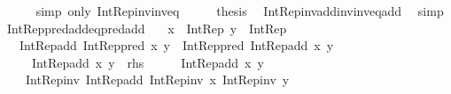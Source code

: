 \begin{isabellebody}
\ \ \ \ \isamarkupfalse%
\ {\isacharparenleft}{\kern0pt}simp\ only{\isacharcolon}{\kern0pt}\ Int{\isacharunderscore}{\kern0pt}Rep{\isacharunderscore}{\kern0pt}inv{\isacharunderscore}{\kern0pt}inv{\isacharunderscore}{\kern0pt}eq{\isacharparenright}{\kern0pt}\isanewline
\ \ \isamarkupfalse%
\ \isamarkupfalse%
\ {\isacharquery}{\kern0pt}thesis\ \isamarkupfalse%
\ Int{\isacharunderscore}{\kern0pt}Rep{\isacharunderscore}{\kern0pt}inv{\isacharunderscore}{\kern0pt}add{\isacharunderscore}{\kern0pt}inv{\isacharunderscore}{\kern0pt}inv{\isacharunderscore}{\kern0pt}eq{\isacharunderscore}{\kern0pt}add\ \isamarkupfalse%
\ simp\isanewline
{}\isamarkupfalse%
%
\endisatagproof
{\isafoldproof}%
%
\isadelimproof
\isanewline
%
\endisadelimproof
\isanewline
{}\isamarkupfalse%
\ Int{\isacharunderscore}{\kern0pt}Rep{\isacharunderscore}{\kern0pt}pred{\isacharunderscore}{\kern0pt}add{\isacharunderscore}{\kern0pt}eq{\isacharunderscore}{\kern0pt}pred{\isacharunderscore}{\kern0pt}add{\isacharcolon}{\kern0pt}\isanewline
\ \ \ {\isachardoublequoteopen}x\ {\isacharcolon}{\kern0pt}\ Int{\isacharunderscore}{\kern0pt}Rep{\isachardoublequoteclose}\ {\isachardoublequoteopen}y\ {\isacharcolon}{\kern0pt}\ Int{\isacharunderscore}{\kern0pt}Rep{\isachardoublequoteclose}\isanewline
\ \ \ {\isachardoublequoteopen}Int{\isacharunderscore}{\kern0pt}Rep{\isacharunderscore}{\kern0pt}add\ {\isacharparenleft}{\kern0pt}Int{\isacharunderscore}{\kern0pt}Rep{\isacharunderscore}{\kern0pt}pred\ x{\isacharparenright}{\kern0pt}\ y\ {\isacharequal}{\kern0pt}\ Int{\isacharunderscore}{\kern0pt}Rep{\isacharunderscore}{\kern0pt}pred\ {\isacharparenleft}{\kern0pt}Int{\isacharunderscore}{\kern0pt}Rep{\isacharunderscore}{\kern0pt}add\ x\ y{\isacharparenright}{\kern0pt}{\isachardoublequoteclose}\isanewline
\ \ \ \ {\isacharparenleft}{\kern0pt}\ {\isachardoublequoteopen}Int{\isacharunderscore}{\kern0pt}Rep{\isacharunderscore}{\kern0pt}add\ {\isacharquery}{\kern0pt}x\ y\ {\isacharequal}{\kern0pt}\ {\isacharquery}{\kern0pt}rhs{\isachardoublequoteclose}{\isacharparenright}{\kern0pt}\isanewline
%
\isadelimproof
%
\endisadelimproof
%
\isatagproof
{}\isamarkupfalse%
\ {\isacharminus}{\kern0pt}\isanewline
\ \ \isamarkupfalse%
\ {\isachardoublequoteopen}Int{\isacharunderscore}{\kern0pt}Rep{\isacharunderscore}{\kern0pt}add\ {\isacharquery}{\kern0pt}x\ y\ {\isacharequal}{\kern0pt}\isanewline
\ \ \ \ Int{\isacharunderscore}{\kern0pt}Rep{\isacharunderscore}{\kern0pt}inv\ {\isacharparenleft}{\kern0pt}Int{\isacharunderscore}{\kern0pt}Rep{\isacharunderscore}{\kern0pt}add\ {\isacharparenleft}{\kern0pt}Int{\isacharunderscore}{\kern0pt}Rep{\isacharunderscore}{\kern0pt}inv\ {\isacharquery}{\kern0pt}x{\isacharparenright}{\kern0pt}\ {\isacharparenleft}{\kern0pt}Int{\isacharunderscore}{\kern0pt}Rep{\isacharunderscore}{\kern0pt}inv\ y{\isacharparenright}{\kern0pt}{\isacharparenright}{\kern0pt}{\isachardoublequoteclose}\isanewline

\end{isabellebody}
